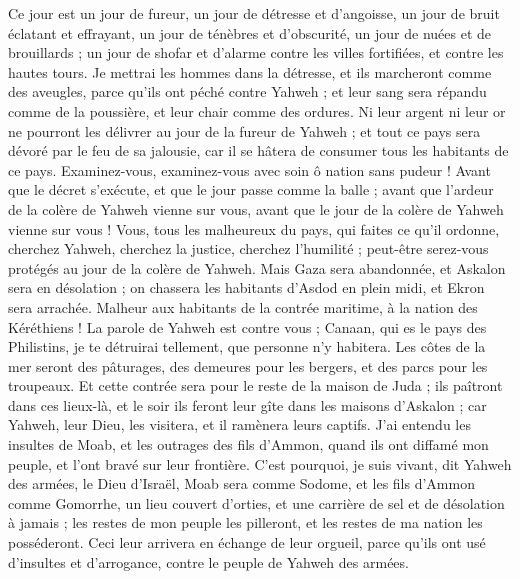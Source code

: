 \begin{multicols}{2}
Ce jour est un jour de fureur, un jour de détresse et d'angoisse, un jour de bruit éclatant et effrayant, un jour de ténèbres et d'obscurité, un jour de nuées et de brouillards ;
un jour de shofar et d'alarme contre les villes fortifiées, et contre les hautes tours.
Je mettrai les hommes dans la détresse, et ils marcheront comme des aveugles, parce qu'ils ont péché contre Yahweh ; et leur sang sera répandu comme de la poussière, et leur chair comme des ordures.
Ni leur argent ni leur or ne pourront les délivrer au jour de la fureur de Yahweh ; et tout ce pays sera dévoré par le feu de sa jalousie, car il se hâtera de consumer tous les habitants de ce pays.
\VerseOne{}Examinez-vous, examinez-vous avec soin ô nation sans pudeur !
Avant que le décret s’exécute, et que le jour passe comme la balle ; avant que l'ardeur de la colère de Yahweh vienne sur vous, avant que le jour de la colère de Yahweh vienne sur vous !
Vous, tous les malheureux du pays, qui faites ce qu'il ordonne, cherchez Yahweh, cherchez la justice, cherchez l’humilité ; peut-être serez-vous protégés au jour de la colère de Yahweh.
Mais Gaza sera abandonnée, et Askalon sera en désolation ; on chassera les habitants d'Asdod en plein midi, et Ekron sera arrachée.
Malheur aux habitants de la contrée maritime, à la nation des Kéréthiens ! La parole de Yahweh est contre vous ; Canaan, qui es le pays des Philistins, je te détruirai tellement, que personne n'y habitera.
Les côtes de la mer seront des pâturages, des demeures pour les bergers, et des parcs pour les troupeaux.
Et cette contrée sera pour le reste de la maison de Juda ; ils paîtront dans ces lieux-là, et le soir ils feront leur gîte dans les maisons d'Askalon ; car Yahweh, leur Dieu, les visitera, et il ramènera leurs captifs.
J'ai entendu les insultes de Moab, et les outrages  des fils d’Ammon, quand ils ont diffamé mon peuple, et l'ont bravé sur leur frontière.
C'est pourquoi, je suis vivant, dit Yahweh des armées, le Dieu d'Israël, Moab sera comme Sodome, et les fils d’Ammon  comme Gomorrhe, un lieu couvert d'orties, et une carrière de sel et de désolation à jamais ; les restes de mon peuple les pilleront, et les restes de ma nation les posséderont.
Ceci leur arrivera en échange de leur orgueil, parce qu'ils ont usé d'insultes et d’arrogance, contre le peuple de Yahweh des armées.

\end{multicols}
